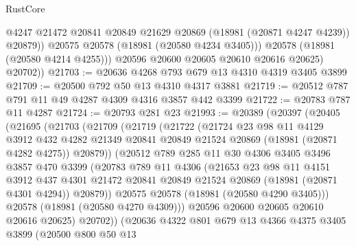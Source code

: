 \begin{lexlean}{RustCore}
\begin{coremodule}
                  @4247
                  @21472
                  @20841
                  @20849
                  @21629
                  @20869
                  (@18981 (@20871 @4247 @4239))
                  @20879))
              @20575
              @20578
              (@18981 (@20580 @4234 @3405)))
            @20578
            (@18981 (@20580 @4214 @4255)))
          @20596
          @20600
          @20605
          @20610
          @20616
          @20625)
        @20702))
@21703 := @20636 @4268 @793 @679 @13 @4310 @4319 @3405 @3899
@21709 := @20500 @792 @50 @13 @4310 @4317 @3881
@21719 := @20512 @787 @791 @11 @49 @4287 @4309 @4316 @3857 @442 @3399
@21722 := @20783 @787 @11 @4287
@21724 := @20793 @281 @23
@21993 := @20389
    (@20397
      (@20405
        (@21695
          (@21703
            (@21709
              (@21719
                (@21722
                  (@21724
                    @23
                    @98
                    @11
                    @4129
                    @3912
                    @432
                    @4282
                    @21349
                    @20841
                    @20849
                    @21524
                    @20869
                    (@18981 (@20871 @4282 @4275))
                    @20879))
                (@20512
                  @789
                  @285
                  @11
                  @30
                  @4306
                  @3405
                  @3496
                  @3857
                  @470
                  @3399
                  (@20783
                    @789
                    @11
                    @4306
                    (@21653
                      @23
                      @98
                      @11
                      @4151
                      @3912
                      @437
                      @4301
                      @21472
                      @20841
                      @20849
                      @21524
                      @20869
                      (@18981 (@20871 @4301 @4294))
                      @20879))
                  @20575
                  @20578
                  (@18981 (@20580 @4290 @3405)))
                @20578
                (@18981 (@20580 @4270 @4309)))
              @20596
              @20600
              @20605
              @20610
              @20616
              @20625)
            @20702))
        (@20636
          @4322
          @801
          @679
          @13
          @4366
          @4375
          @3405
          @3899
          (@20500
            @800
            @50
            @13

\end{coremodule}
\end{lexlean}
